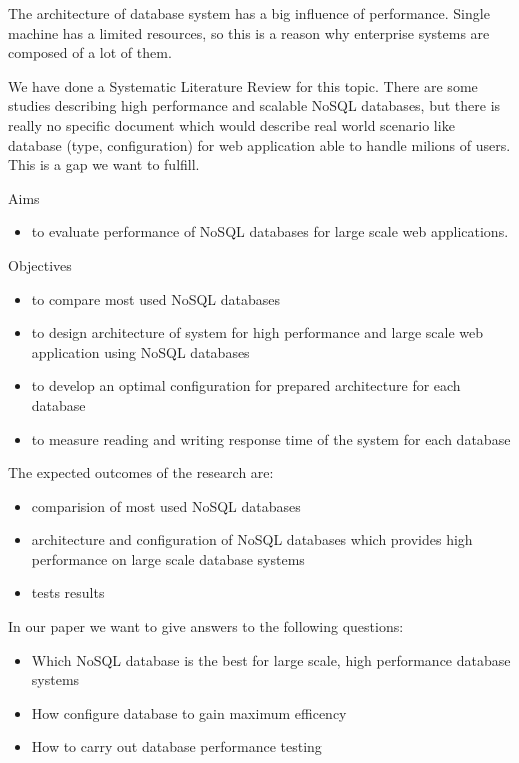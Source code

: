 \documentclass[times, 10pt,twocolumn]{article}
\begin{document}
The architecture of database system has a big influence of performance. Single machine has a limited
resources, so this is a reason why enterprise systems are composed of a lot of them.

We have done a Systematic Literature Review for this topic. There are some studies describing high performance 
and scalable NoSQL databases, but there is really no specific document which would describe real world scenario like 
database (type, configuration) for web application able to handle milions of users. This is a gap we want to fulfill.


Aims
\begin{itemize}
	\item to evaluate performance of NoSQL databases for large scale web applications.
\end{itemize}

Objectives
\begin{itemize}
	\item to compare most used NoSQL databases
	\item to design architecture of system for high performance and large scale web application using NoSQL databases
	\item to develop an optimal configuration for prepared architecture for each database
	\item to measure reading and writing response time of the system for each database
\end{itemize}



The expected outcomes of the research are:

\begin{itemize}
  \item comparision of most used NoSQL databases
  \item architecture and configuration of NoSQL databases which provides high performance on large scale database systems
  \item tests results
\end{itemize}


In our paper we want to give answers to the following questions:

\begin{itemize}
  \item Which NoSQL database is the best for large scale, high performance database systems
  \item How configure database to gain maximum efficency
  \item How to carry out database performance testing
\end{itemize}
 
\end{document}
